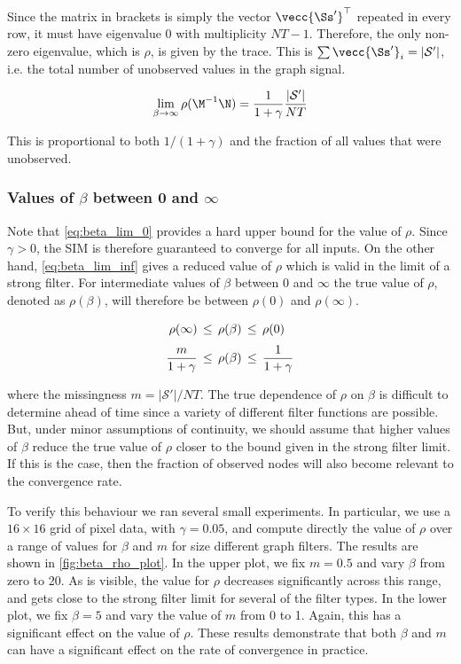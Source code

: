 Since the matrix in brackets is simply the vector $\vecc{\Ss'}^\top$ repeated in every row, it must have eigenvalue 0 with multiplicity $NT - 1$. Therefore, the only non-zero eigenvalue, which is $\rho$, is given by the trace. This is $\sum \vecc{\Ss'}_i = |\mathcal{S}'|$, i.e. the total number of unobserved values in the graph signal. 

\begin{equation}
    \label{eq:beta_lim_inf}
    \lim_{\beta \rightarrow \infty} \rho(\M^{-1}\N) = \frac{1}{1 + \gamma}  \frac{|\mathcal{S}'|}{NT}
\end{equation}

This is proportional to both $1 / (1 + \gamma)$ and the fraction of all values that were unobserved. 



\subsubsection{Values of $\beta$ between 0 and $\infty$}

Note that \cref{eq:beta_lim_0} provides a hard upper bound for the value of $\rho$. Since $\gamma > 0$, the SIM is therefore guaranteed to converge for all inputs. On the other hand, \cref{eq:beta_lim_inf} gives a reduced value of $\rho$ which is valid in the limit of a strong filter. For intermediate values of $\beta$ between 0 and $\infty$ the true value of $\rho$, denoted as $\rho(\beta)$, will therefore be between $\rho(0)$ and $\rho(\infty)$.

\begin{align}
    \label{eq:rho_bounds}
\rho(\infty) \, & \leq \, \rho(\beta) \, \leq \, \rho(0)  \notag \\[0.1cm]
 \frac{m}{1 + \gamma} \, &\leq \, \rho (\beta) \, \leq \, \frac{1}{1 + \gamma}
\end{align}

where the missingness $m = |\mathcal{S}'|/ NT$. The true dependence of $\rho$ on $\beta$ is difficult to determine ahead of time since a variety of different filter functions are possible. But, under minor assumptions of continuity, we should assume that higher values of $\beta$ reduce the true value of $\rho$ closer to the bound given in the strong filter limit. If this is the case, then the fraction of observed nodes will also become relevant to the convergence rate. 

To verify this behaviour we ran several small experiments. In particular, we use a $16 \times 16$ grid of pixel data, with $\gamma = 0.05$, and compute directly the value of $\rho$ over a range of values for $\beta$ and $m$ for size different graph filters. The results are shown in \cref{fig:beta_rho_plot}. In the upper plot, we fix $m = 0.5$ and vary $\beta$ from zero to 20. As is visible, the value for $\rho$ decreases significantly across this range, and gets close to the strong filter limit for several of the filter types. In the lower plot, we fix $\beta=5$ and vary the value of $m$ from 0 to 1. Again, this has a significant effect on the value of $\rho$. These results demonstrate that both $\beta$ and $m$ can have a significant effect on the rate of convergence in practice. 

